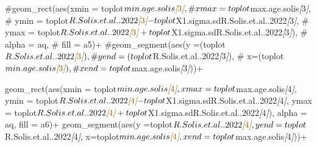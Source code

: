 \documentclass[
]{article}
\newenvironment{Shaded}{\begin{snugshade}}{\end{snugshade}}
\newcommand{\CommentTok}[1]{\textcolor[rgb]{0.56,0.35,0.01}{\textit{#1}}}
\newcommand{\NormalTok}[1]{#1}
\newcommand{\OtherTok}[1]{\textcolor[rgb]{0.56,0.35,0.01}{#1}}
\begin{document}
\begin{Shaded}
\begin{Highlighting}[]
\NormalTok{  \#geom\_rect(aes(xmin = toplot$min.age.solis}\CommentTok{[}\OtherTok{3}\CommentTok{]}\NormalTok{, }
\NormalTok{   \#             xmax = toplot$max.age.solis}\CommentTok{[}\OtherTok{3}\CommentTok{]}\NormalTok{, }
\NormalTok{    \#            ymin = toplot$R.Solis.et.al..2022}\CommentTok{[}\OtherTok{3}\CommentTok{]}\NormalTok{{-}toplot$X1.sigma.sdR.Solis.et.al..2022}\CommentTok{[}\OtherTok{3}\CommentTok{]}\NormalTok{,}
\NormalTok{     \#           ymax = toplot$R.Solis.et.al..2022}\CommentTok{[}\OtherTok{3}\CommentTok{]}\NormalTok{+toplot$X1.sigma.sdR.Solis.et.al..2022}\CommentTok{[}\OtherTok{3}\CommentTok{]}\NormalTok{),}
\NormalTok{      \#      alpha = aq,}
\NormalTok{       \#     fill = a5)+}
\NormalTok{  \#geom\_segment(aes(y =(toplot$R.Solis.et.al..2022}\CommentTok{[}\OtherTok{3}\CommentTok{]}\NormalTok{),}
\NormalTok{   \#                yend =(toplot$R.Solis.et.al..2022}\CommentTok{[}\OtherTok{3}\CommentTok{]}\NormalTok{),}
\NormalTok{    \#               x=(toplot$min.age.solis}\CommentTok{[}\OtherTok{3}\CommentTok{]}\NormalTok{),}
\NormalTok{     \#              xend=toplot$max.age.solis}\CommentTok{[}\OtherTok{3}\CommentTok{]}\NormalTok{))+}
  
\NormalTok{  geom\_rect(aes(xmin = toplot$min.age.solis}\CommentTok{[}\OtherTok{4}\CommentTok{]}\NormalTok{, }
\NormalTok{                xmax = toplot$max.age.solis}\CommentTok{[}\OtherTok{4}\CommentTok{]}\NormalTok{, }
\NormalTok{                ymin = toplot$R.Solis.et.al..2022}\CommentTok{[}\OtherTok{4}\CommentTok{]}\NormalTok{{-}toplot$X1.sigma.sdR.Solis.et.al..2022}\CommentTok{[}\OtherTok{4}\CommentTok{]}\NormalTok{,}
\NormalTok{                ymax = toplot$R.Solis.et.al..2022}\CommentTok{[}\OtherTok{4}\CommentTok{]}\NormalTok{+toplot$X1.sigma.sdR.Solis.et.al..2022}\CommentTok{[}\OtherTok{4}\CommentTok{]}\NormalTok{),}
\NormalTok{            alpha = aq,}
\NormalTok{            fill = a6)+}
\NormalTok{  geom\_segment(aes(y =toplot$R.Solis.et.al..2022}\CommentTok{[}\OtherTok{4}\CommentTok{]}\NormalTok{,}
\NormalTok{                   yend =toplot$R.Solis.et.al..2022}\CommentTok{[}\OtherTok{4}\CommentTok{]}\NormalTok{,}
\NormalTok{                   x=toplot$min.age.solis}\CommentTok{[}\OtherTok{4}\CommentTok{]}\NormalTok{,}
\NormalTok{                   xend=toplot$max.age.solis}\CommentTok{[}\OtherTok{4}\CommentTok{]}\NormalTok{))+}
  

\end{Highlighting}
\end{Shaded}
\end{document}
